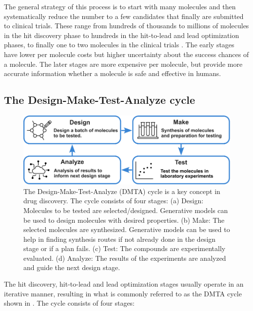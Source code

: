 The general strategy of this process is to start with many molecules and then
systematically reduce the number to a few candidates that finally are submitted to clinical trials.
These range from hundreds of thousands to millions of molecules in the hit discovery phase to hundreds
in the hit-to-lead and lead optimization phases, to finally one to two molecules in the clinical trials \citep{hughesPrinciplesEarlyDrug2011}.
The early stages have lower per molecule costs but higher uncertainty about the success
chances of a molecule. The later stages are more expensive per molecule, but provide more accurate information
whether a molecule is safe and effective in humans.


\subsection{The Design-Make-Test-Analyze cycle}
\begin{figure}
    \centering
    \includegraphics[width=\textwidth]{figures/dmta_cycle_v2.pdf}
    \caption{The Design-Make-Test-Analyze (DMTA) cycle is a key concept in drug discovery. The
        cycle consists of four stages: (a) Design: Molecules to be tested are selected/designed.
        Generative models can be used to design molecules with desired properties. (b) Make: The
        selected molecules are synthesized. Generative models can be used to help in finding
        synthesis routes if not already done in the design stage or if a plan fails. (c) Test:
        The compounds are experimentally evaluated. (d) Analyze: The results of the experiments
        are analyzed and guide the next design stage. \label{fig:dmta-cycle}}
\end{figure}
The hit discovery, hit-to-lead and lead optimization stages usually operate in an iterative manner,
resulting in what is commonly referred to as the \ac{DMTA} cycle \citep{wesolowskiStrategiesPoliticsSuccessful2016}
shown in . The cycle consists of four stages:
